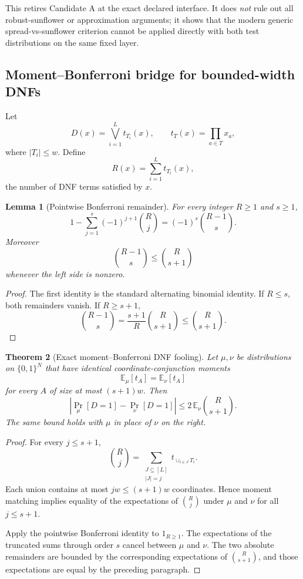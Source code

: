 \documentclass[11pt]{article}
\newtheorem{theorem}{Theorem}
\newtheorem{lemma}[theorem]{Lemma}
\begin{document}
This retires Candidate A at the exact declared interface. It does \emph{not} rule out all robust-sunflower or approximation arguments; it shows that the modern generic spread-vs-sunflower criterion cannot be applied directly with both test distributions on the same fixed layer.

\subsection{Moment--Bonferroni bridge for bounded-width DNFs}
Let
\[
D(x)=\bigvee_{i=1}^{L} t_{T_i}(x),\qquad
t_T(x)=\prod_{a\in T}x_a,
\]
where $|T_i|\le w$. Define
\[
R(x)=\sum_{i=1}^{L}t_{T_i}(x),
\]
the number of DNF terms satisfied by $x$.

\begin{lemma}[Pointwise Bonferroni remainder]
For every integer $R\ge1$ and $s\ge1$,
\[
1-\sum_{j=1}^{s}(-1)^{j+1}\binom Rj
=(-1)^s\binom{R-1}{s}.
\]
Moreover
\[
\binom{R-1}{s}\le \binom R{s+1}
\]
whenever the left side is nonzero.
\end{lemma}
\begin{proof}
The first identity is the standard alternating binomial identity. If $R\le s$, both remainders vanish. If $R\ge s+1$,
\[
\binom{R-1}s=\frac{s+1}{R}\binom R{s+1}\le\binom R{s+1}.
\]
\end{proof}

\begin{theorem}[Exact moment--Bonferroni DNF fooling]
Let $\mu,\nu$ be distributions on $\{0,1\}^N$ that have identical coordinate-conjunction moments
\[
\mathbb E_\mu[t_A]=\mathbb E_\nu[t_A]
\]
for every $A$ of size at most $(s+1)w$. Then
\[
\left|\Pr_\mu[D=1]-\Pr_\nu[D=1]\right|
\le
2\,\mathbb E_\nu\binom R{s+1}.
\]
The same bound holds with $\mu$ in place of $\nu$ on the right.
\end{theorem}
\begin{proof}
For every $j\le s+1$,
\[
\binom Rj
=
\sum_{\substack{J\subseteq[L]\\|J|=j}}
t_{\cup_{i\in J}T_i}.
\]
Each union contains at most $jw\le(s+1)w$ coordinates. Hence moment matching implies equality of the expectations of $\binom Rj$ under $\mu$ and $\nu$ for all $j\le s+1$.

Apply the pointwise Bonferroni identity to $1_{R\ge1}$. The expectations of the truncated sums through order $s$ cancel between $\mu$ and $\nu$. The two absolute remainders are bounded by the corresponding expectations of $\binom R{s+1}$, and those expectations are equal by the preceding paragraph.
\end{proof}
\end{document}
